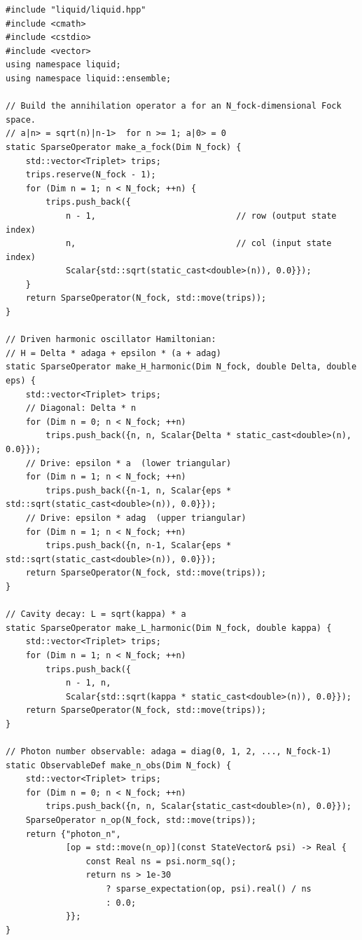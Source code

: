 \documentclass[11pt,a4paper,twoside]{book}
\theoremstyle{definition}
\theoremstyle{remark}
\begin{document}
\begin{verbatim}
#include "liquid/liquid.hpp"
#include <cmath>
#include <cstdio>
#include <vector>
using namespace liquid;
using namespace liquid::ensemble;

// Build the annihilation operator a for an N_fock-dimensional Fock space.
// a|n> = sqrt(n)|n-1>  for n >= 1; a|0> = 0
static SparseOperator make_a_fock(Dim N_fock) {
    std::vector<Triplet> trips;
    trips.reserve(N_fock - 1);
    for (Dim n = 1; n < N_fock; ++n) {
        trips.push_back({
            n - 1,                            // row (output state index)
            n,                                // col (input state index)
            Scalar{std::sqrt(static_cast<double>(n)), 0.0}});
    }
    return SparseOperator(N_fock, std::move(trips));
}

// Driven harmonic oscillator Hamiltonian:
// H = Delta * adaga + epsilon * (a + adag)
static SparseOperator make_H_harmonic(Dim N_fock, double Delta, double eps) {
    std::vector<Triplet> trips;
    // Diagonal: Delta * n
    for (Dim n = 0; n < N_fock; ++n)
        trips.push_back({n, n, Scalar{Delta * static_cast<double>(n), 0.0}});
    // Drive: epsilon * a  (lower triangular)
    for (Dim n = 1; n < N_fock; ++n)
        trips.push_back({n-1, n, Scalar{eps * std::sqrt(static_cast<double>(n)), 0.0}});
    // Drive: epsilon * adag  (upper triangular)
    for (Dim n = 1; n < N_fock; ++n)
        trips.push_back({n, n-1, Scalar{eps * std::sqrt(static_cast<double>(n)), 0.0}});
    return SparseOperator(N_fock, std::move(trips));
}

// Cavity decay: L = sqrt(kappa) * a
static SparseOperator make_L_harmonic(Dim N_fock, double kappa) {
    std::vector<Triplet> trips;
    for (Dim n = 1; n < N_fock; ++n)
        trips.push_back({
            n - 1, n,
            Scalar{std::sqrt(kappa * static_cast<double>(n)), 0.0}});
    return SparseOperator(N_fock, std::move(trips));
}

// Photon number observable: adaga = diag(0, 1, 2, ..., N_fock-1)
static ObservableDef make_n_obs(Dim N_fock) {
    std::vector<Triplet> trips;
    for (Dim n = 0; n < N_fock; ++n)
        trips.push_back({n, n, Scalar{static_cast<double>(n), 0.0}});
    SparseOperator n_op(N_fock, std::move(trips));
    return {"photon_n",
            [op = std::move(n_op)](const StateVector& psi) -> Real {
                const Real ns = psi.norm_sq();
                return ns > 1e-30
                    ? sparse_expectation(op, psi).real() / ns
                    : 0.0;
            }};
}


\end{verbatim}
\end{document}
